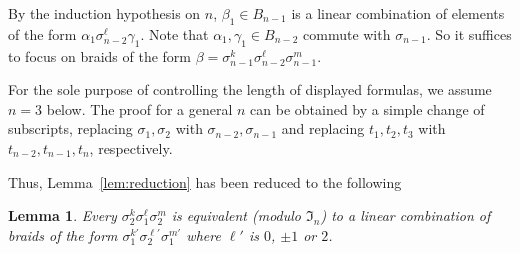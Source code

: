 \documentclass[12pt]{amsart}
\newtheorem{lem}[thm]{Lemma}
\theoremstyle{definition}
\theoremstyle{remark}
\begin{document}
By the induction hypothesis on $n$, $\beta_1\in B_{n-1}$ is a linear combination of
elements of the form $\alpha_1\sigma_{n-2}^\ell \gamma_1$.
Note that $\alpha_1,\gamma_1\in B_{n-2}$ commute with $\sigma_{n-1}$.
So it suffices to focus on braids of the form
$\beta=\sigma_{n-1}^{k}\sigma_{n-2}^{\ell}\sigma_{n-1}^{m}$.

For the sole purpose of controlling the length of displayed formulas,
we assume $n=3$ below.
The proof for a general $n$ can be obtained by a simple change of subscripts,
replacing $\sigma_1,\sigma_2$ with $\sigma_{n-2},\sigma_{n-1}$ and
replacing $t_1,t_2,t_3$ with $t_{n-2},t_{n-1},t_{n}$, respectively.

Thus, Lemma~\ref{lem:reduction} has been reduced to the following
\begin{lem}
\label{lem:key_reduction}
Every $\sigma_2^{k}\sigma_1^{\ell}\sigma_2^{m}$ is equivalent \textup{(modulo $\mathfrak I_n$)} to a linear combination
of braids of the form $\sigma_1^{k'}\sigma_2^{\ell'}\sigma_1^{m'}$ where $\ell'$ is $0$, $\pm1$ or $2$.
\end{lem}
\end{document}

